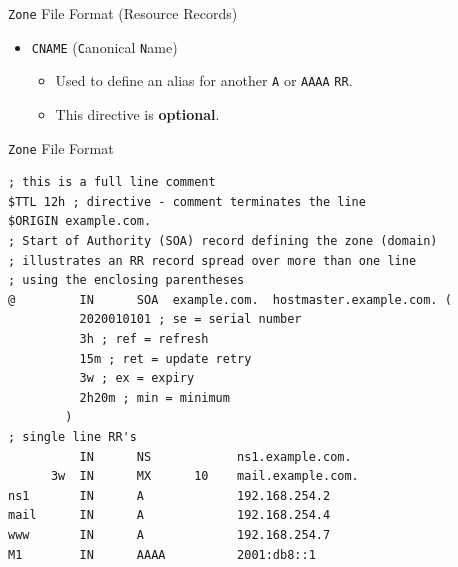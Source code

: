 \documentclass[aspectratio=169,xcolor=table]{beamer}
\begin{document}
\begin{frame}{\texttt{Zone} File Format (Resource Records)}
  \begin{itemize}
    \item \texttt{CNAME} (\texttt{C}anonical \texttt{N}ame)
       \begin{itemize}
          \item Used to define an alias for another \texttt{A} or \texttt{AAAA} \texttt{RR}.
          \item This directive is \textbf{optional}.
       \end{itemize}
  \end{itemize}
\end{frame}

\begin{frame}[fragile]{\texttt{Zone} File Format}
  \lstset{
    basicstyle=\scriptsize\ttfamily,
  }
  \begin{lstlisting}
; this is a full line comment
$TTL 12h ; directive - comment terminates the line
$ORIGIN example.com.
; Start of Authority (SOA) record defining the zone (domain)
; illustrates an RR record spread over more than one line
; using the enclosing parentheses
@         IN      SOA  example.com.  hostmaster.example.com. (
          2020010101 ; se = serial number
          3h ; ref = refresh
          15m ; ret = update retry
          3w ; ex = expiry
          2h20m ; min = minimum
        )
; single line RR's
          IN      NS            ns1.example.com.
      3w  IN      MX      10    mail.example.com.
ns1       IN      A             192.168.254.2
mail      IN      A             192.168.254.4
www       IN      A             192.168.254.7
M1        IN	  AAAA          2001:db8::1
  \end{lstlisting}
\end{frame}
\end{document}
